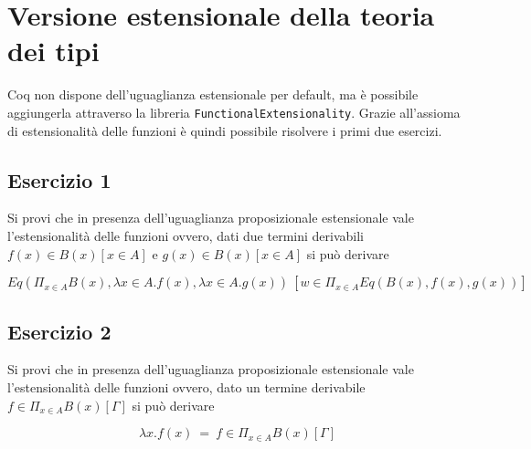 \newpage
\section{Versione estensionale della teoria dei tipi}
Coq non dispone dell'uguaglianza estensionale per default, ma è possibile aggiungerla attraverso la libreria \texttt{FunctionalExtensionality}. Grazie all'assioma di estensionalità delle funzioni è quindi possibile risolvere i primi due esercizi.
\subsection{Esercizio 1}
\begin{thm}
	Si provi che in presenza dell’uguaglianza proposizionale estensionale vale l’estensionalità delle funzioni ovvero, dati due termini derivabili $f(x)\in B(x) [x\in A]$ e $g(x)\in B(x) [x\in A]$ si può	derivare
	
	\[ Eq(\Pi_{x\in A}B(x), \lambda x\in A.f(x), \lambda x\in A.g(x))~[w\in \Pi_{x\in A}Eq(B(x), f(x), g(x))]\]
\end{thm}


\subsection{Esercizio 2}
\begin{thm}
	Si provi che in presenza dell’uguaglianza proposizionale estensionale vale l’estensionalità delle funzioni ovvero, dato un termine derivabile $f\in\Pi_{x\in A} B(x) [\Gamma]$ si può derivare
	
	\[ \lambda x.f(x)~=~f\in\Pi_{x\in A} B(x) [\Gamma] \]
\end{thm}
